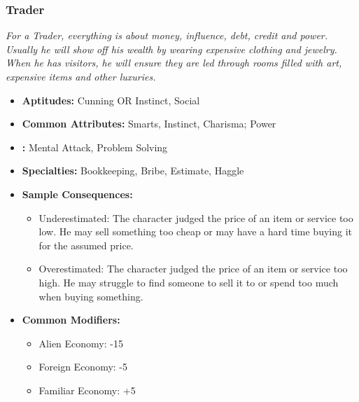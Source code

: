 	\subsubsection{Trader}\label{Trader}
		\textit{For a Trader, everything is about money, influence, debt, credit and power.
		Usually he will show off his wealth by wearing expensive clothing and jewelry.
		When he has visitors, he will ensure they are led through rooms filled with art, expensive items and other luxuries.}
		\begin{itemize}
			\item \textbf{Aptitudes:} Cunning OR Instinct, Social
			\item \textbf{Common Attributes:} Smarts, Instinct, Charisma; Power
			\item \textbf{:} Mental Attack, Problem Solving
			\item \textbf{Specialties:} Bookkeeping, Bribe, Estimate, Haggle
			\item \textbf{Sample Consequences:} 
			\begin{itemize}	
				\item Underestimated: The character judged the price of an item or service too low. He may sell something too cheap or may have a hard time buying it for the assumed price.
				\item Overestimated: The character judged the price of an item or service too high. He may struggle to find someone to sell it to or spend too much when buying something.
			\end{itemize}
			\item \textbf{Common Modifiers:}
			\begin{itemize}
				\item Alien Economy: -15
				\item Foreign Economy: -5
				\item Familiar Economy: +5 
			\end{itemize}
		\end{itemize}


